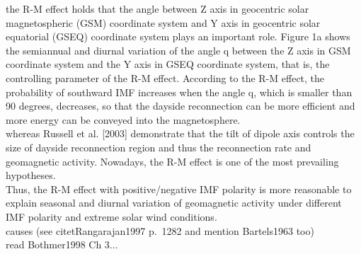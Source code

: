 the R-M effect holds that the angle between Z axis in geocentric solar magnetospheric (GSM) coordinate system and Y axis in geocentric solar equatorial (GSEQ) coordinate system plays an important role. Figure 1a shows the semiannual and diurnal variation of the angle q between the Z axis in GSM coordinate system and the Y axis in GSEQ coordinate system, that is, the controlling parameter of the R-M effect. According to the R-M effect, the probability of southward IMF increases when the angle q, which is smaller than 90 degrees, decreases, so that the dayside reconnection can be more efficient and more energy can be conveyed into the magnetosphere. \citep{Zhao2012}\\

whereas Russell et al. [2003] demonstrate that the tilt of dipole axis controls the size of dayside reconnection region and thus the reconnection rate and geomagnetic activity. Nowadays, the R-M effect is one of the most prevailing hypotheses. \citep{Zhao2012}\\
Thus, the R-M effect with positive/negative IMF polarity is more reasonable to explain seasonal and diurnal variation of geomagnetic activity under different IMF polarity and extreme solar wind conditions. \citep{Zhao2012}\\


causes (see citet{Rangarajan1997} p.~1282 and mention Bartels1963 too)\\
read Bothmer1998 Ch 3...\\












